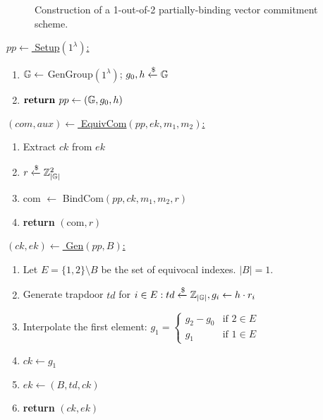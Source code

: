 \begin{figure}[h]
  \caption{Construction of a 1-out-of-2 partially-binding vector commitment scheme.}
  \label{fig:half-binding}
\end{figure}
\begin{breakablefig}
    \begin{minipage}{0.45\linewidth}
      \vspace{-4em}
      \underline{$pp \leftarrow$ Setup$(1^\lambda)$:}
      \begin{enumerate}
        \item $\mathbb{G} \leftarrow $ GenGroup$(1^\lambda)$; $g_0, h \xleftarrow{\$} \mathbb{G}$
        \item $\textbf{return } pp \leftarrow (\mathbb{G}, g_0, h)$
      \end{enumerate}  
    \end{minipage}
    \begin{minipage}{0.5\linewidth}
      \underline{$(com, aux) \leftarrow$ EquivCom$(pp, ek, m_1, m_2)$:}
      \begin{enumerate}
        \item Extract $ck$ from $ek$
        \item $r \xleftarrow{\$} \mathbb{Z}_{|\mathbb{G}|}^2$
        \item com $\leftarrow$ BindCom$(pp,ck,m_1,m_2,r)$
        \item \textbf{return} $(\text{com}, r)$
      \end{enumerate}  
    \end{minipage}

    \underline{$(ck, ek) \leftarrow$ Gen$(pp, B)$:}
    \begin{enumerate}
      \item Let $E = \{1,2\} \setminus B$ be the set of equivocal indexes. $|B| = 1$.
      \item Generate trapdoor $td$ for $i \in E: td \xleftarrow{\$} \mathbb{Z}_{|\mathbb{G}|}, g_i \leftarrow h \cdot r_i$
      \item Interpolate the first element: $g_1 = \begin{cases}
       g_2 - g_0 & \text{if $2 \in E$} \\
       g_1 & \text{if $1 \in E$}
      \end{cases}$
      \item $ck \leftarrow g_1$
      \item $ek \leftarrow (B, td, ck)$
      \item \textbf{return} $(ck, ek)$
    \end{enumerate}


\end{breakablefig}
